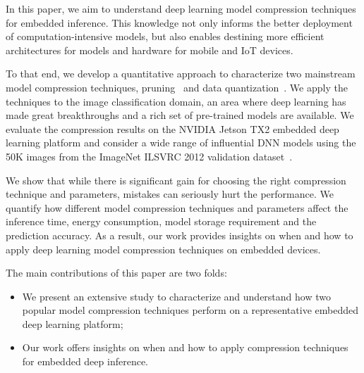 In this paper, we aim to understand deep learning model compression techniques for embedded inference. This knowledge not only informs the
better deployment of computation-intensive models, but also enables destining more efficient architectures for models and hardware for
mobile and IoT devices.

To that end, we develop a quantitative approach  to characterize two mainstream model compression techniques,
pruning~\cite{cheng2017survey} and data quantization~\cite{Gong2014Compressing}. We apply the techniques to the image classification
domain, an area where deep learning has made great breakthroughs and a rich set of pre-trained models are available. We evaluate the
compression results on the NVIDIA Jetson TX2 embedded deep learning platform and consider a wide range of influential DNN models using the
50K images from the ImageNet ILSVRC 2012 validation dataset~\cite{imagenet2012}.


We show that while there is significant gain for choosing the right compression technique and parameters, mistakes can seriously hurt the
performance. We quantify how different model compression techniques and parameters affect the inference time, energy consumption, model
storage requirement and the prediction accuracy. As a result, our work provides insights on when and how to apply deep learning model
compression techniques on embedded devices.

The main contributions of this paper are two folds:

\begin{itemize}
\item We present an extensive study to characterize and understand how two popular model compression techniques perform on a
    representative embedded deep learning platform;
\item Our work offers insights on when and how to apply compression techniques for embedded deep inference.
\end{itemize}
